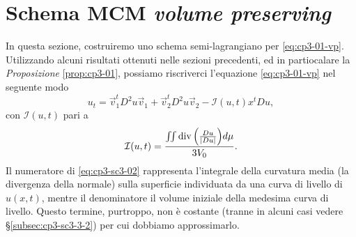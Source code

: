 \section{Schema MCM \emph{volume preserving}}
\label{sec:cp3-sc3-3}

In questa sezione, costruiremo uno schema semi-lagrangiano per
\eqref{eq:cp3-01-vp}. Utilizzando alcuni risultati ottenuti nelle
sezioni precedenti, ed in partiocalare la
\emph{Proposizione} \ref{prop:cp3-01}, possiamo riscriverci l'equazione \eqref{eq:cp3-01-vp} nel seguente modo
\begin{equation}
\label{eq:cp3-sc3-01}
u_t = \vec{v}_1^tD^2u\vec{v}_1 +\vec{v}_2^tD^2u\vec{v}_2-\mathcal{I}(u,t)x^tDu,
\end{equation}
con $\mathcal{I}(u,t)$ pari a
\begin{equation}
\label{eq:cp3-sc3-02}
\mathcal{I}(u,t) = \frac{\iint\operatorname{div}{\left(\frac{Du}{|Du|}\right)}d\mu}{3V_0}.
\end{equation}
Il numeratore di \eqref{eq:cp3-sc3-02} rappresenta l'integrale della
curvatura media (la divergenza della normale) sulla superficie
individuata da una curva di livello di $u(x,t)$, mentre il
denominatore il volume iniziale della medesima curva di livello. Questo
termine, purtroppo, non è costante (tranne in alcuni casi vedere
§\ref{subsec:cp3-sc3-3-2}) per cui dobbiamo
approssimarlo.
%
